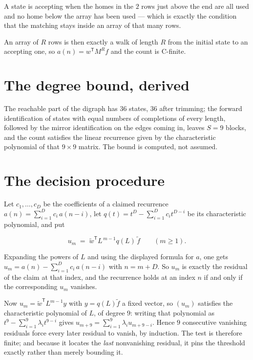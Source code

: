 \documentclass[11pt]{article}
\theoremstyle{definition}
\begin{document}
A state is accepting when the homes in the $2$ rows just above the end are all used and no home below the array has been used --- which is exactly the condition that the matching stays inside an array of that many rows.

An array of $R$ rows is then exactly a walk of length $R$ from the initial state to an accepting one, so $a(n) = w^{\mathsf T}M^{R}f$ and the count is C-finite.

\section{The degree bound, derived}

The reachable part of the digraph has $36$ states, $36$ after trimming; the forward identification of states with equal numbers of completions of every length, followed by the mirror identification on the edges coming in, leaves $S = 9$ blocks, and the count satisfies the linear recurrence given by the characteristic polynomial of that $9\times9$ matrix. The bound is computed, not assumed.

\section{The decision procedure}

Let $c_1,\dots,c_D$ be the coefficients of a claimed recurrence $a(n) = \sum_{i=1}^{D} c_i\,a(n-i)$, let $q(t) = t^{D} - \sum_{i=1}^{D} c_i t^{D-i}$ be its characteristic polynomial, and put

\[u_m \;=\; \tilde w^{\mathsf T} L^{\,m-1} q(L)\,\tilde f \qquad (m \ge 1).\]

Expanding the powers of $L$ and using the displayed formula for $a$, one gets $u_m = a(n) - \sum_{i=1}^{D} c_i\,a(n-i)$ with $n = m + D$. So $u_m$ is exactly the residual of the claim at that index, and the recurrence holds at an index $n$ if and only if the corresponding $u_m$ vanishes.

Now $u_m = \tilde w^{\mathsf T} L^{m-1} y$ with $y = q(L)\tilde f$ a fixed vector, so $(u_m)$ satisfies the characteristic polynomial of $L$, of degree $9$: writing that polynomial as $t^{9} - \sum_{i=1}^{9} \lambda_i t^{9-i}$ gives $u_{m+9} = \sum_{i=1}^{9} \lambda_i u_{m+9-i}$. Hence $9$ consecutive vanishing residuals force every later residual to vanish, by induction. The test is therefore finite; and because it locates the {\itshape last} nonvanishing residual, it pins the threshold exactly rather than merely bounding it.
\end{document}

